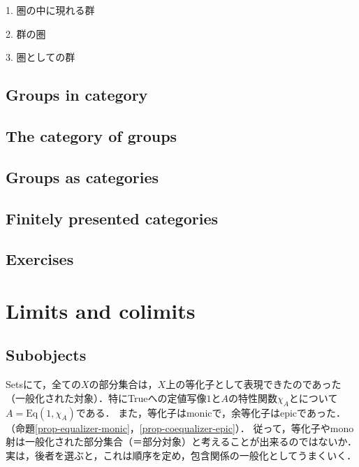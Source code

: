 \documentclass[uplatex, 12pt, dvipdfmx]{jsarticle}
\begin{document}
1. 圏の中に現れる群

2. 群の圏

3. 圏としての群

\subsection{Groups in category}
\subsection{The category of groups}
\subsection{Groups as categories}
\subsection{Finitely presented categories}
\subsection{Exercises}

\section{Limits and colimits}

\subsection{Subobjects}

Setsにて，全ての$X$の部分集合は，$X$上の等化子として表現できたのであった（一般化された対象）．特にTrueへの定値写像$1$と$A$の特性関数$\chi_A$とについて$A=\mathrm{Eq}(1,\chi_A)$である．
また，等化子はmonicで，余等化子はepicであった．（命題\ref{prop-equalizer-monic}，\ref{prop-coequalizer-epic}）．
従って，等化子やmono射は一般化された部分集合（＝部分対象）と考えることが出来るのではないか．実は，後者を選ぶと，これは順序を定め，包含関係の一般化としてうまくいく．
\end{document}
